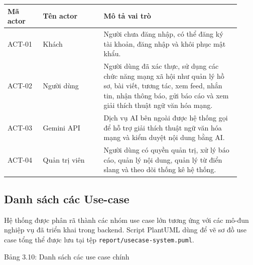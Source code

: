 {\def\LTcaptype{none}
\begin{longtable}{
  |>{\centering\arraybackslash}p{0.14\linewidth}
  |>{\raggedright\arraybackslash}p{0.24\linewidth}
  |>{\raggedright\arraybackslash}p{0.54\linewidth}|}
\hline
\textbf{Mã actor} & \textbf{Tên actor} & \textbf{Mô tả vai trò} \\ \hline
\endhead
\hline
\endlastfoot
ACT-01 & Khách & Người chưa đăng nhập, có thể đăng ký tài khoản, đăng nhập và khôi phục mật khẩu. \\ \hline
ACT-02 & Người dùng & Người dùng đã xác thực, sử dụng các chức năng mạng xã hội như quản lý hồ sơ, bài viết, tương tác, xem feed, nhắn tin, nhận thông báo, gửi báo cáo và xem giải thích thuật ngữ văn hóa mạng. \\ \hline
ACT-03 & Gemini API & Dịch vụ AI bên ngoài được hệ thống gọi để hỗ trợ giải thích thuật ngữ văn hóa mạng và kiểm duyệt nội dung bằng AI. \\ \hline
ACT-04 & Quản trị viên & Người dùng có quyền quản trị, xử lý báo cáo, quản lý nội dung, quản lý từ điển slang và theo dõi thống kê hệ thống. \\ \hline
\end{longtable}
}

\subsection{Danh sách các Use-case}

Hệ thống được phân rã thành các nhóm use case lớn tương ứng với các mô-đun nghiệp vụ đã triển khai trong backend. Script PlantUML dùng để vẽ sơ đồ use case tổng thể được lưu tại tệp \texttt{report/usecase-system.puml}.

Bảng 3.10: Danh sách các use case chính

